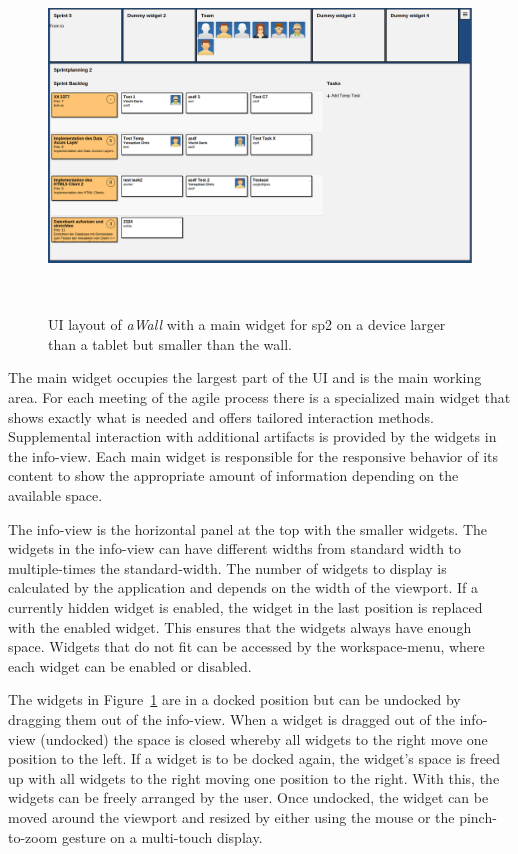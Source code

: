 \documentclass{sigchi}
\begin{document}
\begin{figure}[h]
	\centering
	\includegraphics[width=\columnwidth]{figures/awall-layout}
	\caption{UI layout of \textit{aWall} with a main widget for \gls{sp2} on a device larger than a tablet but smaller than the wall.}~\label{fig:awall-layout}
\end{figure}

The main widget occupies the largest part of the UI and is the main working area.
For each meeting of the agile process there is a specialized main widget that shows exactly what is needed and offers tailored interaction methods.
Supplemental interaction with additional artifacts is provided by the widgets in the info-view.
Each main widget is responsible for the responsive behavior of its content to show the appropriate amount of information depending on the available space.


The info-view is the horizontal panel at the top with the smaller widgets.
The widgets in the info-view can have different widths from standard width to multiple-times the standard-width.
The number of widgets to display is calculated by the application and depends on the width of the viewport.
If a currently hidden widget is enabled, the widget in the last position is replaced with the enabled widget.
This ensures that the widgets always have enough space.
Widgets that do not fit can be accessed by the workspace-menu, where each widget can be enabled or disabled. 


The widgets in Figure~\ref{fig:awall-layout} are in a docked position but can be undocked by dragging them out of the info-view.
When a widget is dragged out of the info-view (undocked) the space is closed whereby all widgets to the right move one position to the left.
If a widget is to be docked again, the widget's space is freed up with all widgets to the right moving one position to the right.
With this, the widgets can be freely arranged by the user.
Once undocked, the widget can be moved around the viewport and resized by either using the mouse or the pinch-to-zoom gesture on a multi-touch display. 
\end{document}
